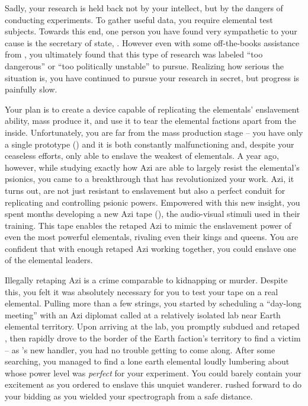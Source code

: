 \documentclass[char]{elementals}
\begin{document}
Sadly, your research is held back not by your intellect, but by the dangers of conducting experiments. To gather useful data, you require elemental test subjects. Towards this end, one person you have found very sympathetic to your cause is the secretary of state, \cDema{\intro}. However even with some off-the-books assistance from \cDema{}, you ultimately found that this type of research was labeled ``too dangerous'' or ``too politically unstable'' to pursue. Realizing how serious the situation is, you have continued to pursue your research in secret, but progress is painfully slow.

Your plan is to create a device capable of replicating the elementals' enslavement ability, mass produce it, and use it to tear the elemental factions apart from the inside. Unfortunately, you are far from the mass production stage -- you have only a single prototype (\iControlRod{}) and it is both constantly malfunctioning and, despite your ceaseless efforts, only able to enslave the weakest of elementals. A year ago, however, while studying exactly how Azi are able to largely resist the elemental's psionics, you came to a breakthrough that has revolutionized your work. Azi, it turns out, are not just resistant to enslavement but also a perfect conduit for replicating and controlling psionic powers. Empowered with this new insight, you spent months developing a new Azi tape (\iAziTape{}), the audio-visual stimuli used in their training. This tape enables the retaped Azi to mimic the enslavement power of even the most powerful elementals, rivaling even their kings and queens. You are confident that with enough retaped Azi working together, you could enslave one of the elemental leaders.

Illegally retaping Azi is a crime comparable to kidnapping or murder. Despite this, you felt it was absolutely necessary for you to test your tape on a real elemental. Pulling more than a few strings, you started by scheduling a ``day-long meeting'' with an Azi diplomat called \cDiplomat{\intro} at a relatively isolated lab near Earth elemental territory. Upon arriving at the lab, you promptly subdued and retaped \cDiplomat{}, then rapidly drove to the border of the Earth faction's territory to find a victim -- as \cDiplomat{}'s new handler, you had no trouble getting \cDiplomat{\them} to come along. After some searching, you managed to find a lone earth elemental loudly lumbering about whose power level was \emph{perfect} for your experiment. You could barely contain your excitement as you ordered \cDiplomat{} to enslave this unquiet wanderer. \cDiplomat{} rushed forward to do your bidding as you wielded your spectrograph from a safe distance.
\end{document}

